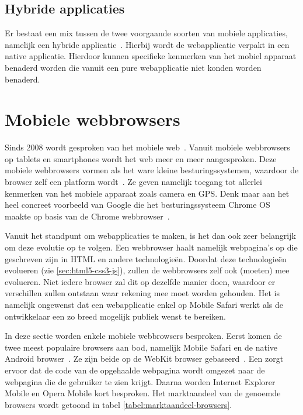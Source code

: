 \subsection{Hybride applicaties}
Er bestaat een mix tussen de twee voorgaande soorten van mobiele applicaties, namelijk een hybride applicatie~\cite{Accenture2012}. 
Hierbij wordt de webapplicatie verpakt in een native applicatie. 
Hierdoor kunnen specifieke kenmerken van het mobiel apparaat benaderd worden die vanuit een pure webapplicatie niet konden worden benaderd.


\section{Mobiele webbrowsers}
\label{sec:mobiele-webbrowsers}
Sinds 2008 wordt gesproken van het mobiele web~\cite{Hales2012}. 
Vanuit mobiele webbrowsers op tablets en smartphones wordt het web meer en meer aangesproken. 
Deze mobiele webbrowsers vormen als het ware kleine besturingssystemen, waardoor de browser zelf een platform wordt~\cite{Hales2012}. 
Ze geven namelijk toegang tot allerlei kenmerken van het mobiele apparaat zoals camera en GPS. 
Denk maar aan het heel concreet voorbeeld van Google die het besturingssysteem Chrome OS maakte op basis van de Chrome webbrowser~\cite{Hales2012}.

Vanuit het standpunt om webapplicaties te maken, is het dan ook zeer belangrijk om deze evolutie op te volgen. 
Een webbrowser haalt namelijk webpagina's op die geschreven zijn in HTML en andere technologieën. 
Doordat deze technologieën evolueren (zie \ref{sec:html5-css3-js}), zullen de webbrowsers zelf ook (moeten) mee evolueren. 
Niet iedere browser zal dit op dezelfde manier doen, waardoor er verschillen zullen ontstaan waar  rekening mee moet worden gehouden. 
Het is namelijk ongewenst dat een webapplicatie enkel op Mobile Safari werkt als de ontwikkelaar een zo breed mogelijk publiek wenst te bereiken. 

In deze sectie worden enkele mobiele webbrowsers besproken. 
Eerst komen de twee meest populaire browsers aan bod, namelijk Mobile Safari en de native Android browser~\cite{Hales2012}. 
Ze zijn beide op de WebKit browser  gebaseerd~\cite{Oeflman2011}. 
Een  zorgt ervoor dat de code van de opgehaalde webpagina wordt omgezet naar de webpagina die de gebruiker te zien krijgt. 
Daarna worden Internet Explorer Mobile en Opera Mobile kort besproken. 
Het marktaandeel van de genoemde browsers wordt getoond in tabel \ref{tabel:marktaandeel-browsers}.


